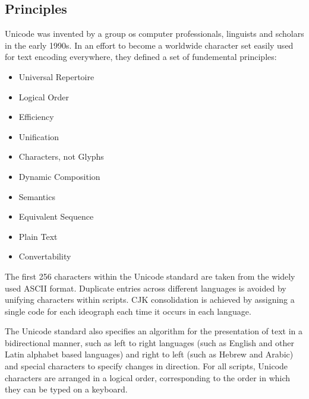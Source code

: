 \subsection{Principles}

Unicode was invented by a group os computer professionals, linguists and
scholars in the early 1990s. In an effort to become a worldwide
character set easily used for text encoding everywhere, they defined a
set of fundemental principles:

\begin{itemize}

\item Universal Repertoire

\item Logical Order

\item Efficiency

\item Unification

\item Characters, not Glyphs

\item Dynamic Composition

\item Semantics

\item Equivalent Sequence

\item Plain Text

\item Convertability

\end{itemize}

The first 256 characters within the Unicode standard are taken from the
widely used ASCII format. Duplicate entries across different languages
is avoided by unifying characters within scripts. CJK consolidation is
achieved by assigning a single code for each ideograph each time it
occurs in each language.

The Unicode standard also specifies an algorithm for the presentation of
text in a bidirectional manner, such as left to right languages (such as
English and other Latin alphabet based languages) and right to left
(such as Hebrew and Arabic) and special characters to specify changes in
direction. For all scripts, Unicode characters are arranged in a
logical order, corresponding to the order in which they can be typed on
a keyboard.

